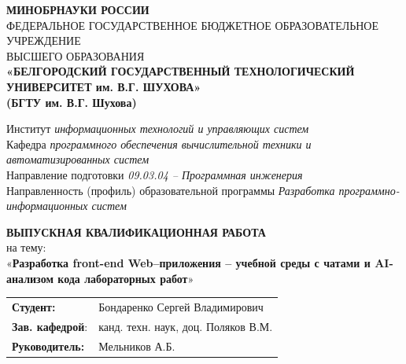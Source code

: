 
\newcommand{\No}{\textnumero}








\begin{titlepage}
    \centering
    {\small \textbf{МИНОБРНАУКИ РОССИИ}}\\
    {\small ФЕДЕРАЛЬНОЕ ГОСУДАРСТВЕННОЕ БЮДЖЕТНОЕ ОБРАЗОВАТЕЛЬНОЕ УЧРЕЖДЕНИЕ}\\
    {\small ВЫСШЕГО ОБРАЗОВАНИЯ}\\
    \textbf{
    «БЕЛГОРОДСКИЙ ГОСУДАРСТВЕННЫЙ ТЕХНОЛОГИЧЕСКИЙ \\
    УНИВЕРСИТЕТ им. В.Г. ШУХОВА» \\
    (БГТУ им. В.Г. Шухова) \\
    }
    
    \vfill %
    
    \raggedright
    Институт \textit{информационных технологий и управляющих систем}\\
    Кафедра \textit{программного обеспечения вычислительной техники и автоматизированных систем}\\
    Направление подготовки \textit{09.03.04 – Программная инженерия}\\
    Направленность (профиль) образовательной программы \textit{Разработка программно-информационных систем}
    
    \centering
    \vfill
    
    \textbf{ВЫПУСКНАЯ КВАЛИФИКАЦИОННАЯ РАБОТА}\\
    {\large на тему:\\[1ex]
    «\textbf{Разработка front-end Web–приложения – учебной среды с чатами и AI-анализом кода лабораторных работ}»}
    
    \vfill %
    
    \raggedright
    \begin{tabular}{@{} l l @{}}
        \textbf{Студент:}       & Бондаренко Сергей Владимирович \\
        \textbf{Зав. кафедрой}: & канд. техн. наук, доц. Поляков В.М. \\
        \textbf{Руководитель:}  & Мельников А.Б.
    \end{tabular}
    

\end{titlepage}
